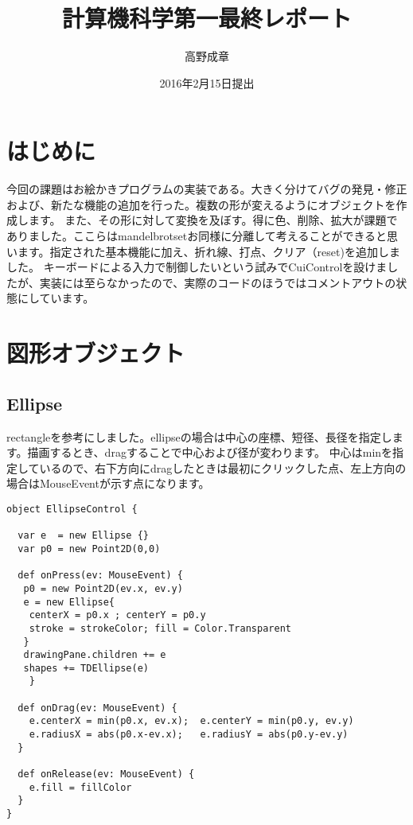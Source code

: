 \documentclass [11pt] {jsarticle}
\title {計算機科学第一最終レポート}
\author {高野成章}
\date {2016年2月15日提出}
\begin{document}
\maketitle

\section {はじめに}
今回の課題はお絵かきプログラムの実装である。大きく分けてバグの発見・修正および、新たな機能の追加を行った。複数の形が変えるようにオブジェクトを作成します。
また、その形に対して変換を及ぼす。得に色、削除、拡大が課題でありました。ここらはmandelbrotsetお同様に分離して考えることができると思います。指定された基本機能に加え、折れ線、打点、クリア（reset)を追加しました。
キーボードによる入力で制御したいという試みでCuiControlを設けましたが、実装には至らなかったので、実際のコードのほうではコメントアウトの状態にしています。

\section {図形オブジェクト}
\subsection{Ellipse}
rectangleを参考にしました。ellipseの場合は中心の座標、短径、長径を指定します。描画するとき、dragすることで中心および径が変わります。
中心はminを指定しているので、右下方向にdragしたときは最初にクリックした点、左上方向の場合はMouseEventが示す点になります。
\begin{verbatim}
object EllipseControl {

  var e  = new Ellipse {}
  var p0 = new Point2D(0,0)

  def onPress(ev: MouseEvent) {
   p0 = new Point2D(ev.x, ev.y)
   e = new Ellipse{
    centerX = p0.x ; centerY = p0.y
    stroke = strokeColor; fill = Color.Transparent
   }
   drawingPane.children += e
   shapes += TDEllipse(e)
    }

  def onDrag(ev: MouseEvent) {
    e.centerX = min(p0.x, ev.x);  e.centerY = min(p0.y, ev.y)
    e.radiusX = abs(p0.x-ev.x);   e.radiusY = abs(p0.y-ev.y)
  }

  def onRelease(ev: MouseEvent) {
    e.fill = fillColor
  }
}
\end{verbatim}
\end{document}
